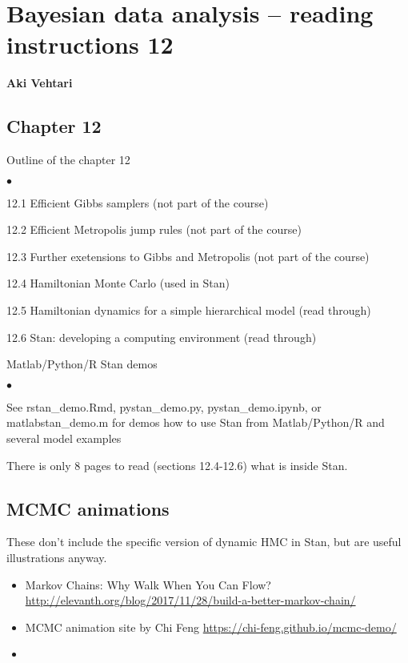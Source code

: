\documentclass[a4paper,11pt,english]{article}
\begin{document}
\thispagestyle{empty}

\section*{Bayesian data analysis -- reading instructions 12} 
\smallskip
{\bf Aki Vehtari}
\smallskip

\subsection*{Chapter 12}

Outline of the chapter 12
\begin{list}{$\bullet$}{\parsep=0pt\itemsep=2pt}
\item 12.1 Efficient Gibbs samplers (not part of the course)
\item 12.2 Efficient Metropolis jump rules (not part of the course)
\item 12.3 Further exetensions to Gibbs and Metropolis (not part of the course)
\item 12.4 Hamiltonian Monte Carlo (used in Stan)
\item 12.5 Hamiltonian dynamics for a simple hierarchical model (read through)
\item 12.6 Stan: developing a computing environment (read through)
\end{list}

\noindent
Matlab/Python/R Stan demos
\begin{list}{$\bullet$}{\parsep=0pt\itemsep=2pt}
\item See rstan\_demo.Rmd, pystan\_demo.py, pystan\_demo.ipynb, or matlabstan\_demo.m
  for demos how to use Stan from Matlab/Python/R and several model examples
\end{list}

\noindent
There is only 8 pages to read (sections 12.4-12.6) what is inside Stan.


\subsection*{MCMC animations}

These don't include the specific version of dynamic HMC in Stan, but are useful illustrations anyway.
 \begin{itemize}
 \item Markov Chains: Why Walk When You Can Flow? \url{http://elevanth.org/blog/2017/11/28/build-a-better-markov-chain/}
 \item MCMC animation site by Chi Feng \url{https://chi-feng.github.io/mcmc-demo/}
 \item 
 \end{itemize}
\end{document}
